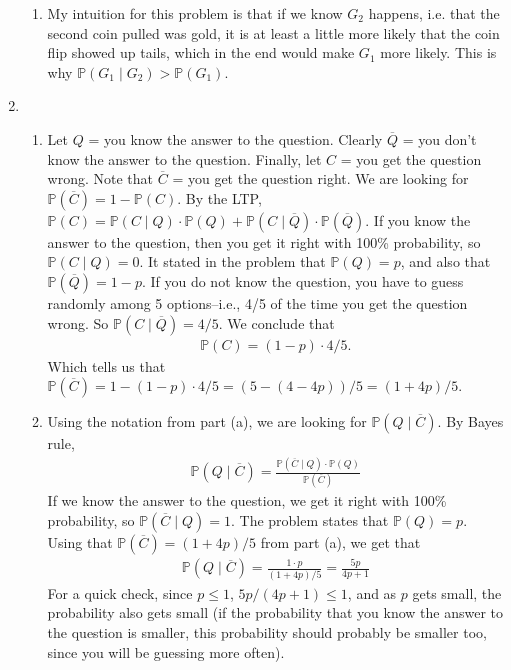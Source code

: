 \documentclass[12pt]{article}
\theoremstyle{definition}
\theoremstyle{remark}
\renewcommand{\P}{\mathbb{P}}
\begin{document}
\begin{enumerate}[leftmargin=\labelsep]
\begin{enumerate}
			\item My intuition for this problem is that if we know $G_2$ happens, i.e. that the second coin pulled was gold, it is at least a little more likely that the coin flip showed up tails, which in the end would make $G_1$ more likely. This is why $\P(G_1 \mid G_2) > \P(G_1)$.
		\end{enumerate}
	
		\newpage
		\item 
		\begin{enumerate}
			\item Let $Q$ = you know the answer to the question. Clearly $\overline{Q}$ = you don't know the answer to the question. Finally, let $C$ = you get the question wrong. Note that $\overline{C}$ = you get the question right. We are looking for $\P(\overline{C}) = 1 - \P(C)$. By the LTP, $\P(C) = \P(C \mid Q) \cdot \P(Q) + \P(C \mid \overline{Q}) \cdot \P(\overline{Q})$. If you know the answer to the question, then you get it right with 100\% probability, so $\P(C \mid Q) = 0$. It stated in the problem that $\P(Q) = p$, and also that $\P(\overline{Q}) = 1-p$. If you do not know the question, you have to guess randomly among 5 options--i.e., 4/5 of the time you get the question wrong. So $\P(C \mid \overline{Q}) = 4/5$. We conclude that
			\begin{align*}
				\P(C) = (1-p) \cdot 4/5.
			\end{align*}
			Which tells us that $\P(\overline{C}) = 1 - (1-p) \cdot 4/5 = (5 - (4-4p))/5 = (1+4p)/5$.
			\item Using the notation from part (a), we are looking for $\P(Q \mid \overline{C})$. By Bayes rule,
			\begin{align*}
				\P(Q \mid \overline{C}) = \frac{\P(\overline{C} \mid Q) \cdot \P(Q)}{\P(\overline{C})}
			\end{align*}	
			If we know the answer to the question, we get it right with 100\% probability, so $\P(\overline{C} \mid Q) = 1$. The problem states that $\P(Q) = p$. Using that $\P(\overline{C}) = (1+4p)/5$ from part (a), we get that
			\begin{align*}
				\P(Q \mid \overline{C}) = \frac {1 \cdot p}{(1+4p)/5} = \frac{5p}{4p + 1}
			\end{align*}
			For a quick check, since $p \leq 1$, $5p/(4p+1) \leq 1$, and as $p$ gets small, the probability also gets small (if the probability that you know the answer to the question is smaller, this probability should probably be smaller too, since you will be guessing more often).
		\end{enumerate}
	

\end{enumerate}
\end{document}
